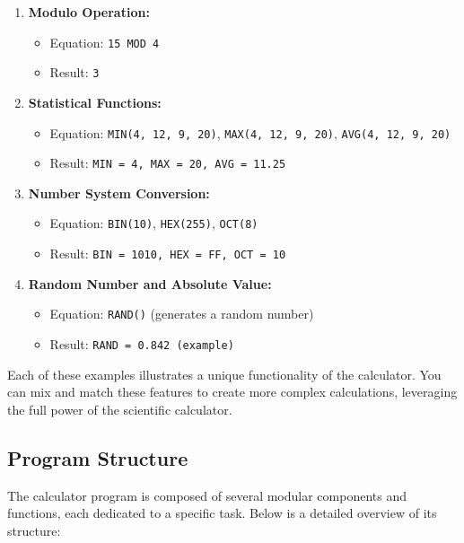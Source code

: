 \documentclass[a4paper,12pt]{article}
\begin{document}
\begin{enumerate}
    \item \textbf{Modulo Operation:}
    \begin{itemize}
        \item Equation: \texttt{15 MOD 4}
        \item Result: \texttt{3}
    \end{itemize}

    \item \textbf{Statistical Functions:}
    \begin{itemize}
        \item Equation: \texttt{MIN(4, 12, 9, 20)}, \texttt{MAX(4, 12, 9, 20)}, \texttt{AVG(4, 12, 9, 20)}
        \item Result: \texttt{MIN = 4, MAX = 20, AVG = 11.25}
    \end{itemize}

    \item \textbf{Number System Conversion:}
    \begin{itemize}
        \item Equation: \texttt{BIN(10)}, \texttt{HEX(255)}, \texttt{OCT(8)}
        \item Result: \texttt{BIN = 1010, HEX = FF, OCT = 10}
    \end{itemize}

    \item \textbf{Random Number and Absolute Value:}
    \begin{itemize}
        \item Equation: \texttt{RAND()} (generates a random number)
        \item Result: \texttt{RAND = 0.842 (example)}
    \end{itemize}
\end{enumerate}

Each of these examples illustrates a unique functionality of the calculator. You can mix and match these features to create more complex calculations, leveraging the full power of the scientific calculator.

\subsection{Program Structure}

The calculator program is composed of several modular components and functions, each dedicated to a specific task. Below is a detailed overview of its structure:
\end{document}
